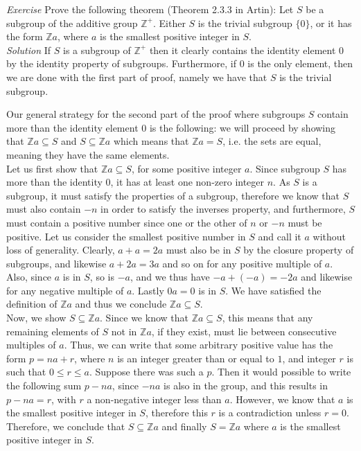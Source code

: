 \textit{Exercise} Prove the following theorem (Theorem 2.3.3 in Artin): Let $S$ be a subgroup of the additive group $\mathbb{Z}^{+}$.  Either $S$ is the trivial subgroup $\{0\}$, or it has the form $\mathbb{Z}a$, where $a$ is the smallest positive integer in $S$.\\

\textit{Solution} If $S$ is a subgroup of $\mathbb{Z}^{+}$ then it clearly contains the identity element $0$ by the identity property of subgroups.  Furthermore, if $0$ is the only element, then we are done with the first part of proof, namely we have that $S$ is the trivial subgroup.

Our general strategy for the second part of the proof where subgroups $S$ contain more than the identity element $0$ is the following:  we will proceed by showing that $\mathbb{Z}a \subseteq S$ and $S \subseteq \mathbb{Z}a$ which means that $\mathbb{Z}a=S$, i.e. the sets are equal, meaning they have the same elements.\\

Let us first show that $\mathbb{Z}a \subseteq S$, for some positive integer $a$. Since subgroup $S$ has more than the identity $0$, it has at least one non-zero integer $n$.  As $S$ is a subgroup, it must satisfy the properties of a subgroup, therefore we know that $S$ must also contain $-n$ in order to satisfy the inverses property, and furthermore, $S$ must contain a positive number since one or the other of $n$ or $-n$ must be positive.  Let us consider the smallest positive number in $S$ and call it $a$ without loss of generality.  Clearly, $a+a=2a$ must also be in $S$ by the closure property of subgroups, and likewise $a+2a=3a$ and so on for any positive multiple of $a$.  Also, since $a$ is in $S$, so is $-a$, and we thus have $-a+(-a)=-2a$ and likewise for any negative multiple of $a$.  Lastly $0a=0$ is in $S$.  We have satisfied the definition of $\mathbb{Z}a$ and thus we conclude $\mathbb{Z}a \subseteq S.$\\

Now, we show $S \subseteq \mathbb{Z}a$.  Since we know that $\mathbb{Z}a \subseteq S$, this means that any remaining elements of $S$ not in $\mathbb{Z}a$, if they exist, must lie between consecutive multiples of $a$.  Thus, we can write that some arbitrary positive value has the form $p=na+r$, where $n$ is an integer greater than or equal to $1$, and integer $r$ is such that $0 \le r \le a$.  Suppose there was such a $p$.  Then it would possible to write the following sum $p-na$, since $-na$ is also in the group, and this results in $p-na=r$, with $r$ a non-negative integer less than $a$.  However, we know that $a$ is the smallest positive integer in $S$, therefore this $r$ is a contradiction unless $r=0$.  Therefore, we conclude that $S \subseteq \mathbb{Z}a$ and finally $S=\mathbb{Z}a$ where $a$ is the smallest positive integer in $S$.\\

